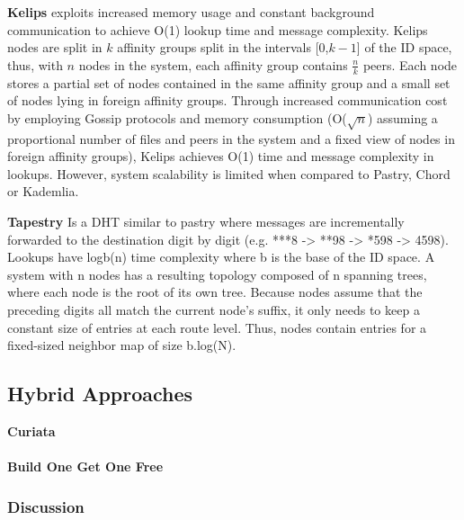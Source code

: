 \textbf{Kelips} \cite{gupta2003kelips} exploits increased memory usage and constant background communication to achieve O(1) lookup time and message complexity. Kelips nodes are split in $k$ affinity groups split in the intervals [0,$k-1$] of the ID space, thus, with $n$ nodes in the system, each affinity group contains $\frac{n}{k}$ peers. Each node stores a partial set of nodes contained in the same affinity group and a small set of nodes lying in foreign affinity groups. Through increased communication cost by employing Gossip protocols and memory consumption (O($\sqrt{n}$) assuming a proportional number of files and peers in the system and a fixed view of nodes in foreign affinity groups), Kelips achieves O(1) time and message complexity in lookups. However, system scalability is limited when compared to Pastry, Chord or Kademlia. 

\textbf{Tapestry} \cite{tapestry} Is a DHT similar to pastry where messages are incrementally forwarded to the destination digit by digit (e.g. ***8 -> **98 -> *598 -> 4598). Lookups have logb(n) time complexity where b is the base of the ID space. A system with n nodes has a resulting topology composed of n spanning trees, where each node is the root of its own tree. Because nodes assume that the preceding digits all match the current node's suffix, it only needs to keep a constant size of entries at each route level. Thus, nodes contain entries for a fixed-sized neighbor map of size b.log(N). 

\subsection{Hybrid Approaches}

\textbf{Curiata}

\paragraph{\textbf{Build One Get One Free}}

\subsubsection{Discussion}






